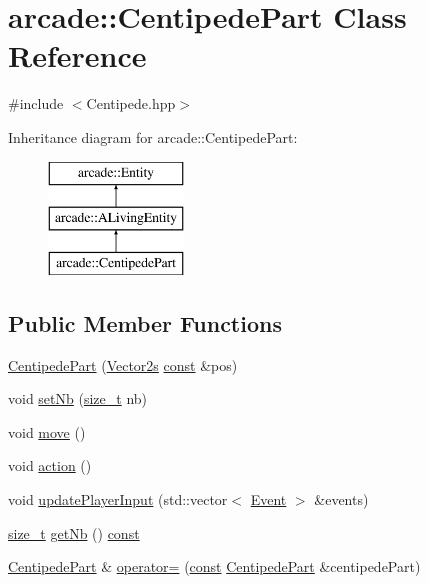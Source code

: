 \hypertarget{classarcade_1_1_centipede_part}{\section{arcade\-:\-:Centipede\-Part Class Reference}
\label{classarcade_1_1_centipede_part}
}


{\ttfamily \#include $<$Centipede.\-hpp$>$}

Inheritance diagram for arcade\-:\-:Centipede\-Part\-:\begin{figure}[H]
\begin{center}
\leavevmode
\includegraphics[height=3.000000cm]{classarcade_1_1_centipede_part}
\end{center}
\end{figure}
\subsection*{Public Member Functions}
\begin{DoxyCompactItemize}
\item 
\hyperlink{classarcade_1_1_centipede_part_a01758c1b9183f8d702e3cee1531b41be}{Centipede\-Part} (\hyperlink{namespacearcade_a8e527f7400fbff9c38dc31e0a3dd06a1}{Vector2s} \hyperlink{term__entry_8h_a57bd63ce7f9a353488880e3de6692d5a}{const} \&pos)
\item 
void \hyperlink{classarcade_1_1_centipede_part_ad5a68c49881269f580aaa92a1e70fb0b}{set\-Nb} (\hyperlink{nc__alloc_8h_a7b60c5629e55e8ec87a4547dd4abced4}{size\-\_\-t} nb)
\item 
void \hyperlink{classarcade_1_1_centipede_part_aed1ed6a654d9d081d5c260f7c7101c75}{move} ()
\item 
void \hyperlink{classarcade_1_1_centipede_part_a6d1531fea950e8319229cb0eeea3dec9}{action} ()
\item 
void \hyperlink{classarcade_1_1_centipede_part_a45c3f651a41a6258de5a1a9e26a2a60a}{update\-Player\-Input} (std\-::vector$<$ \hyperlink{structarcade_1_1_event}{Event} $>$ \&events)
\item 
\hyperlink{nc__alloc_8h_a7b60c5629e55e8ec87a4547dd4abced4}{size\-\_\-t} \hyperlink{classarcade_1_1_centipede_part_aeae1a49c2e32bd1bc6b269bd778a2401}{get\-Nb} () \hyperlink{term__entry_8h_a57bd63ce7f9a353488880e3de6692d5a}{const} 
\item 
\hyperlink{classarcade_1_1_centipede_part}{Centipede\-Part} \& \hyperlink{classarcade_1_1_centipede_part_a9679a40a0ebf9bb31433254bca59584c}{operator=} (\hyperlink{term__entry_8h_a57bd63ce7f9a353488880e3de6692d5a}{const} \hyperlink{classarcade_1_1_centipede_part}{Centipede\-Part} \&centipede\-Part)
\end{DoxyCompactItemize}
